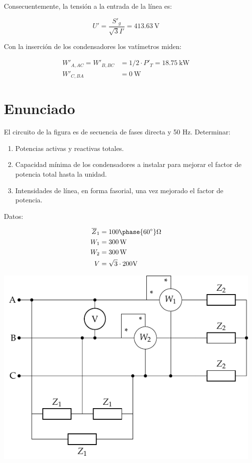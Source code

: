 Consecuentemente, la tensión a la entrada de la línea es:

\[
U' = \frac{S'_g}{\sqrt{3} I'} = \SI{413.63}{\volt}
\]

Con la inserción de los condensadores los vatímetros miden:

\begin{align*}
W'_{A, AC} = W'_{B, BC} &= 1/2 \cdot P'_T = \SI{18.75}{\kilo\watt}\\
W'_{C, BA} &= \SI{0}{\watt}
\end{align*}



\section{Enunciado}

El circuito de la figura es de secuencia de fases directa y 50 Hz. Determinar:
\begin{enumerate}
\item Potencias activas y reactivas totales.
\item Capacidad mínima de los condensadores a instalar para mejorar el factor de potencia total hasta la unidad.
\item Intensidades de línea, en forma fasorial, una vez mejorado el factor de potencia.
\end{enumerate}
Datos: 

\begin{align*}
  \overline{Z}_1 &= {100\phase{\ang{60}}}\unit{\ohm}\\
  W_1 &= \SI{300}{\watt}\\
  W_2 &= \SI{300}{\watt}\\
  V &= {\sqrt{3} \cdot 200}\unit{\volt}
\end{align*}

\begin{center}
  \includegraphics{figuras/ZyZt}
\end{center}

